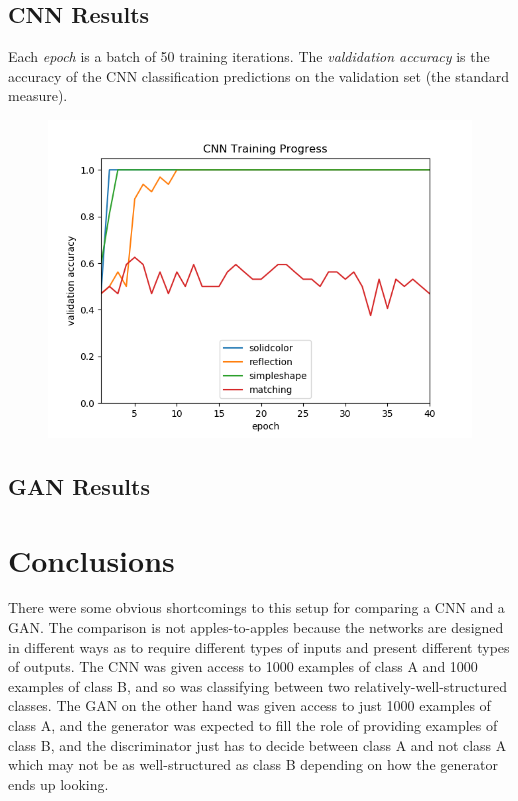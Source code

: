 \documentclass{article}
\renewcommand{\it}{\textit}
\begin{document}
\subsection{CNN Results}

Each \it{epoch} is a batch of 50 training iterations.
The \it{valdidation accuracy} is the accuracy of the CNN classification predictions on the validation set (the standard measure).

\begin{figure}[ht]
\centering
\includegraphics[width=\textwidth]{cnn-results.png}
\end{figure}

\subsection{GAN Results}




\section{Conclusions}

There were some obvious shortcomings to this setup for comparing a CNN and a GAN.
The comparison is not apples-to-apples because the networks are designed in different ways as to require different types of inputs and present different types of outputs.
The CNN was given access to 1000 examples of class A and 1000 examples of class B, and so was classifying between two relatively-well-structured classes.
The GAN on the other hand was given access to just 1000 examples of class A, and the generator was expected to fill the role of providing examples of class B, and the discriminator just has to decide between class A and not class A which may not be as well-structured as class B depending on how the generator ends up looking.
\end{document}
